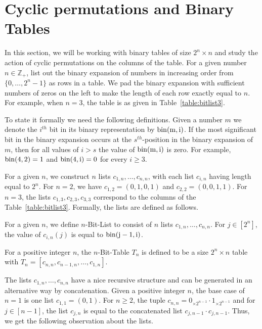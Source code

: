 \section{Cyclic permutations and Binary Tables}
In this section, we will be working with binary tables of size $2^n \times n$ and study the action of cyclic permutations on the columns of the table. For a given number $n \in \mathbb{Z}_+$, list out the binary expansion of numbers in increasing order from $\{0,\dots,2^n-1\}$ as rows in a table. We pad the binary expansion with sufficient numbers of zeros on the left to make the length of each row exactly equal to $n$.
For example, when $n=3$, the table is as given in Table~\ref{table:bitlist3}.

To state it formally we need the following definitions. Given a number $m$ we denote the $i^{th}$  bit in its binary representation by $\rm{bin}(m,i)$. If the most significant bit in the binary expansion occurs at the $s^{th}$-position in the binary expansion of $m$, then for all values of $i>s$ the value of $\rm{bin}(m,i)$ is zero. For example, $\rm{bin}(4,2)=1$ and $\rm{bin}(4,i)=0$ for every $i\geq 3$.

For a given $n$, we construct $n$ lists $c_{1,n}, \dots, c_{n,n}$, with each list $c_{i,n}$ having length equal to $2^n$. 
For $n=2$, we have $c_{1,2} = (0,1,0,1)$ and $c_{2,2} = (0,0,1,1)$.
For $n=3$, the lists $c_{1,3},c_{2,3},c_{3,3}$ correspond to the columns of the Table~\ref{table:bitlist3}. %
Formally, the lists are defined as follows.

\begin{definition}
 For a given $n$, we define $n$-Bit-List to consist of $n$ lists $c_{1,n}, \dots, c_{n,n}$. For $j\in [2^n]$, the value of $c_{i,n}(j)$ is equal to $\rm{bin}(j-1,i)$.
\end{definition}

\begin{definition}
 For a positive integer $n$, the $n$-Bit-Table $T_n$ is defined to be a size $2^n\times n$ table with $T_n=[c_{n,n},c_{n-1,n},\dots,c_{1,n}]$. 
\end{definition}

The lists $c_{1,n}, \dots, c_{n,n}$ have a nice recursive structure and can be generated in an alternative way by concatenation.
Given a positive integer $n$, the base case of $n=1$ is one list $c_{1,1}=(0,1)$.
For $n\geq 2$, the tuple $c_{n,n}=0_{\times 2^{n-1}}\cdot 1_{\times 2^{n-1}}$ and for $j\in [n-1]$, the list $c_{j,n}$ is equal to the concatenated list $c_{j,n-1}\cdot c_{j,n-1}$. Thus, we get the following observation about the lists.

